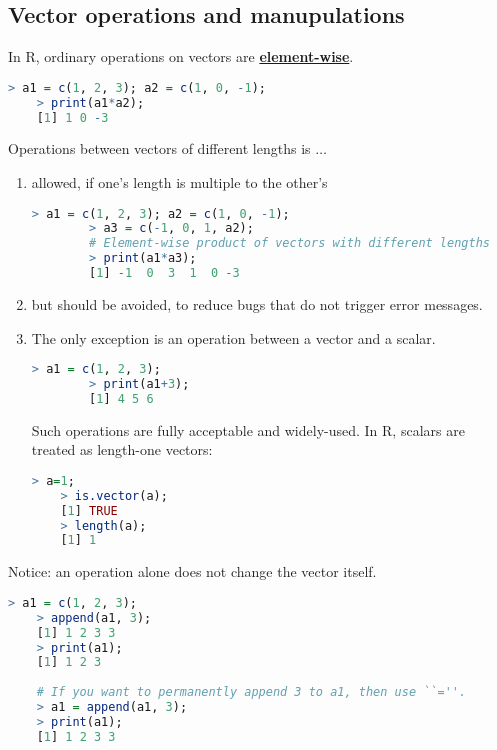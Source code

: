 \documentclass[10pt]{article}
\begin{document}



\subsection{Vector operations and manupulations}
In R, ordinary operations on vectors are \underline{\bf element-wise}.
\begin{lstlisting}[style=displaycode, language=R]
	> a1 = c(1, 2, 3); a2 = c(1, 0, -1);
	> print(a1*a2);
	[1] 1 0 -3
\end{lstlisting}
Operations between vectors of different lengths is $\ldots$
\begin{enumerate}
	\item allowed, if one's length is multiple to the other's
	\begin{lstlisting}[style=displaycode, language=R]
		> a1 = c(1, 2, 3); a2 = c(1, 0, -1);
		> a3 = c(-1, 0, 1, a2);
		# Element-wise product of vectors with different lengths
		> print(a1*a3);
		[1] -1  0  3  1  0 -3
	\end{lstlisting}
	\item but should be avoided, to reduce bugs that do not trigger error messages.
	\item The only exception is an operation between a vector and a scalar.
	\begin{lstlisting}[style=displaycode, language=R]
		> a1 = c(1, 2, 3);
		> print(a1+3);
		[1] 4 5 6
	\end{lstlisting}
	Such operations are fully acceptable and widely-used. In R, scalars are treated as length-one vectors:
\begin{lstlisting}[style=displaycode, language=R]
	> a=1;
	> is.vector(a);
	[1] TRUE
	> length(a);
	[1] 1
\end{lstlisting}
\end{enumerate}

Notice: an operation alone does not change the vector itself.
\begin{lstlisting}[style=displaycode, language=R]
	> a1 = c(1, 2, 3);
	> append(a1, 3);
	[1] 1 2 3 3
	> print(a1);
	[1] 1 2 3
	
	# If you want to permanently append 3 to a1, then use ``=''.
	> a1 = append(a1, 3);
	> print(a1);
	[1] 1 2 3 3
\end{lstlisting}
\end{document}
